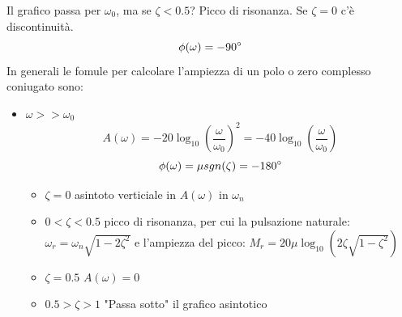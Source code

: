 \documentclass[a4paper]{article}
\begin{document}
\begin{enumerate}
\begin{itemize}
        Il grafico passa per $\omega_0$, ma se $\zeta <0.5$? Picco di risonanza.
        Se $\zeta = 0$ c'è discontinuità.
        \[\phi(\omega)  = -90\degree\]
        In generali le fomule per calcolare l'ampiezza di un polo o zero complesso coniugato sono:
        \begin{itemize}
            \item $\omega >> \omega_0$
            \[A(\omega) = -20\log_{10} \left(\frac{\omega}{\omega_0}\right)^2 = -40\log_{10} \left(\frac{\omega}{\omega_0}\right)\]
            \[\phi(\omega) = \mu sgn(\zeta) = -180\degree\]
            \begin{itemize}
                \item $\zeta = 0$ asintoto verticiale in $A(\omega)$ in $\omega_n$
                \item $0 < \zeta < 0.5$ picco di risonanza, per cui la pulsazione naturale: $\omega_r = \omega_n\sqrt{1-2\zeta^2}$ e l'ampiezza del picco: $M_r = 20\mu\log_{10}(2\zeta\sqrt{1-\zeta^2})$
                \item $\zeta = 0.5$ $A(\omega) = 0$
                \item $0.5 > \zeta > 1$ "Passa sotto" il grafico asintotico
            \end{itemize}
        \end{itemize}
    \end{itemize}
\end{enumerate}
\end{document}
